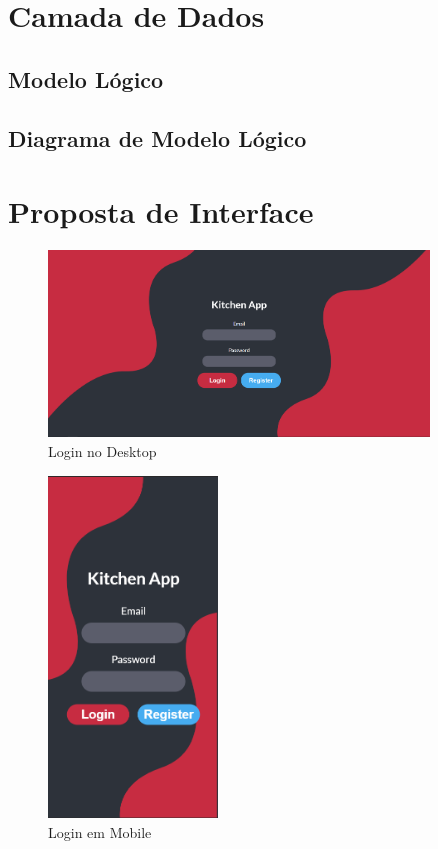 \documentclass[a4paper]{report}
\begin{document}
\chapter{Camada de Dados}
    \section{Modelo Lógico}
    \section{Diagrama de Modelo Lógico}

\chapter{Proposta de Interface}
    \begin{figure}[H]
    \centering
            \includegraphics[width=0.9\textwidth]{images/mockup/login_desktop.png}
            \caption{Login no Desktop}
    \end{figure}
    \begin{figure}[H]
    \centering
            \includegraphics[width=0.4\textwidth]{images/mockup/login_mobile.png}
            \caption{Login em Mobile}
    \end{figure}
\end{document}
